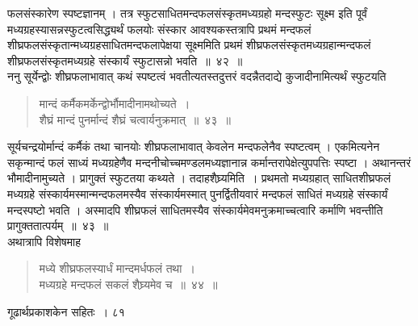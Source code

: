 \documentclass[11pt, openany]{book}
\begin{document}
\begin{sloppypar}
\noindent फलसंस्कारेण स्पष्टज्ञानम् । तत्र स्फुटसाधितमन्दफलसंस्कृतमध्यग्रहो मन्दस्फुटः सूक्ष्म इति पूर्वं मध्यग्रहस्यासन्नस्फुटत्वसिद्ध्यर्थं फलयोः संस्कार आवश्यकस्तत्रापि प्रथमं मन्दफलं शीघ्रफलसंस्कृतान्मध्यग्रहसाधितमन्दफलापेक्षया सूक्ष्ममिति प्रथमं शीघ्रफलसंस्कृतमध्यग्रहान्मन्दफलं शीघ्रफलसंस्कृतमध्यग्रहे संस्कार्यं स्फुटासन्नो भवति~॥~४२~॥\\
\noindent ननु सूर्येन्द्वोः शीघ्रफलाभावात् कथं स्पष्टत्वं भवतीत्यतस्तदुत्तरं वदन्नैतदाद्ये कुजादीनामित्यर्थं स्फुटयति\textendash
\end{sloppypar}
\begin{quote}

{\ssi मान्दं कर्मैकमर्केन्द्वोर्भौमादीनामथोच्यते~।\\
शैघ्रं मान्दं पुनर्मान्दं शैघ्रं चत्वार्यनुक्रमात्~॥~४३~॥}
\end{quote}
\begin{sloppypar}
सूर्यचन्द्रयोर्मान्दं कर्मैकं तथा चानयोः शीघ्रफलाभावात् केवलेन मन्दफलेनैव स्पष्टत्वम् । एकमित्यनेन सकृन्मान्दं फलं साध्यं मध्यग्रहेणैव मन्दनीचोच्चमण्डलमध्यज्ञानान्न कर्मान्तरापेक्षेत्युपपत्तिः स्पष्टा । अथानन्तरं भौमादीनामुच्यते । प्रागुक्तं स्फुटतया कथ्यते । तदाह\textendash शैघ्र्यमिति~। प्रथमतो मध्यग्रहात् साधितशीघ्रफलं मध्यग्रहे संस्कार्यमस्मान्मन्दफलमस्यैव संस्कार्यमस्मात् पुनर्द्वितीयवारं मन्दफलं साधितं मध्यग्रहे संस्कार्यं मन्दस्पष्टो भवति । अस्मादपि शीघ्रफलं साधितमस्यैव संस्कार्यमेवमनुक्रमाच्चत्वारि कर्माणि भवन्तीति प्रागुक्ततात्पर्यम्~॥~४३~॥\\
\noindent अथात्रापि विशेषमाह\textendash
\end{sloppypar}
\begin{quote}

{\ssi मध्ये शीघ्रफलस्यार्धं मान्दमर्धफलं तथा~।\\
मध्यग्रहे मन्दफलं सकलं शैघ्र्यमेव च~॥~४४~॥}
\end{quote}

\newpage


\hspace{3cm} गूढार्थप्रकाशकेन सहितः~। \hfill ८१
\vspace{1cm}
\end{document}

